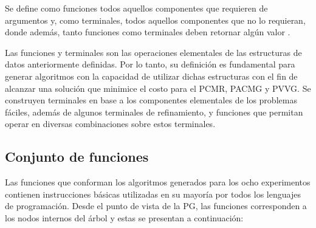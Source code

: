 Se define como funciones todos aquellos componentes que requieren de argumentos y, como terminales, todos aquellos componentes que no lo requieran, donde además, tanto funciones como terminales deben retornar algún valor \citep{koza1992genetic}. 

Las funciones y terminales son las operaciones elementales de las estructuras de datos anteriormente definidas. Por lo tanto, su definición es fundamental para generar algoritmos con la capacidad de utilizar dichas estructuras con el fin de alcanzar una solución que minimice el costo para el PCMR, PACMG y PVVG. Se construyen terminales en base a los componentes elementales de los problemas fáciles, además de algunos terminales de refinamiento, y funciones que permitan operar en diversas combinaciones sobre estos terminales.



\subsection{Conjunto de funciones}

Las funciones que conforman los algoritmos generados para los ocho experimentos contienen instrucciones básicas utilizadas en su mayoría por todos los lenguajes de programación. Desde el punto de vista de la PG, las funciones corresponden a los nodos internos del árbol \citep{koza_poli_2005} y estas se presentan a continuación:

